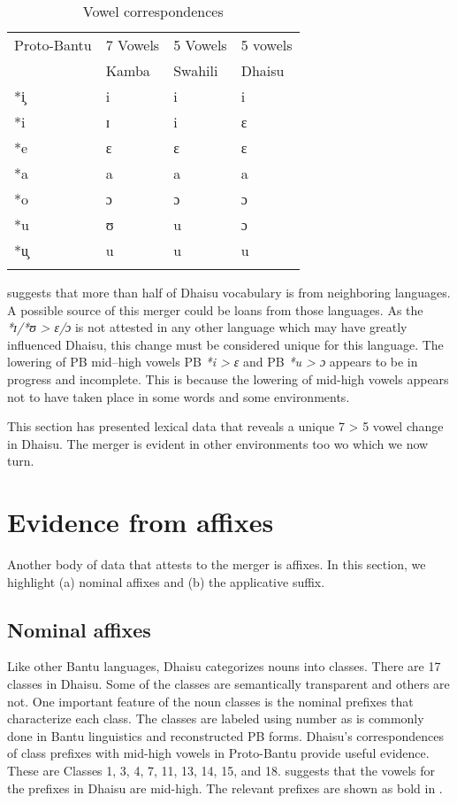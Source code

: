 \documentclass[output=paper,colorlinks,citecolor=brown]{langscibook}
\begin{document}
\begin{table}
	\caption{Vowel correspondences} 
    \label{tab:ngonyani:13}
    \begin{tabular}{llll}
    \lsptoprule
        Proto-Bantu &	7 Vowels	& 5 Vowels & 5 vowels\\
         & Kamba & Swahili & Dhaisu \\
    \midrule
        *i̧ & i & i & i\\
        *i & ɪ & i & ɛ \\
        *e & ɛ & ɛ & ɛ \\
        *a & a & a & a \\
        *o & ɔ & ɔ & ɔ \\
        *u & ʊ & u & ɔ\\
        *u̧ & u & u & u \\
    \lspbottomrule
    \end{tabular}
\end{table}
\cite[20]{Nurse2000} suggests that more than half of Dhaisu vocabulary is from neighboring languages. A possible source of this merger could be loans from those languages. As the  \textit{*ɪ/*ʊ > ɛ/ɔ} is not attested in any other language which may have greatly influenced Dhaisu, this change must be considered unique for this language. The lowering of PB mid–high vowels  PB \textit{*i > ɛ} and PB \textit{*u > ɔ} appears to be in progress and incomplete. This is because the lowering of mid-high vowels appears not to have taken place in some words and some environments. 

This section has presented lexical data that reveals a unique 7 > 5 vowel change in Dhaisu. The merger is evident in other environments too wo which we now turn. 

\section{Evidence from affixes}\label{sec:ngonyani:4}

Another body of data that attests to the merger is affixes. In this section, we highlight (a) nominal affixes and (b) the applicative suffix.

\subsection{Nominal affixes}\label{sec:ngonyani:4.1}

Like other Bantu languages, Dhaisu categorizes nouns into classes. There are 17 classes in Dhaisu. Some of the classes are semantically transparent and others are not. One important feature of the noun classes is the nominal prefixes that characterize each class. The classes are labeled using number as is commonly done in Bantu linguistics and reconstructed PB forms. Dhaisu’s correspondences of class prefixes with mid-high vowels in Proto-Bantu provide useful evidence. These are Classes 1, 3, 4, 7, 11, 13, 14, 15, and 18.  \cite[22]{Nurse2000} suggests that the vowels for the prefixes in Dhaisu are mid-high. The relevant prefixes are shown as bold in .
\end{document}
